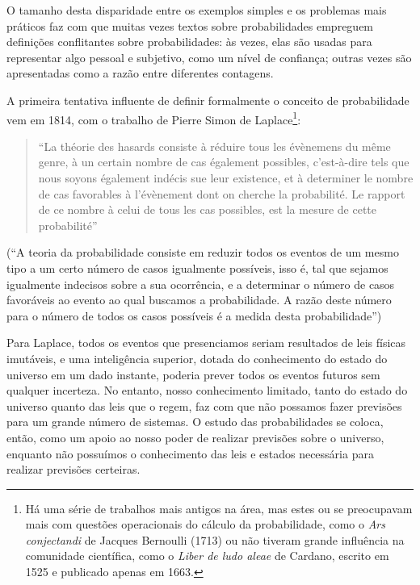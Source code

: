 O tamanho desta disparidade entre os exemplos simples e os problemas mais práticos faz com que muitas vezes
textos sobre probabilidades empreguem definições conflitantes sobre probabilidades: às vezes,
elas são usadas para representar algo pessoal e subjetivo, como um nível de confiança; outras vezes são apresentadas como a
razão entre diferentes contagens.

A primeira tentativa influente de definir formalmente o conceito de probabilidade vem em 1814,
com o trabalho de Pierre Simon de Laplace\footnote{
	Há uma série de trabalhos mais antigos na área, mas estes ou se preocupavam mais com questões
	operacionais do cálculo da probabilidade, como o {\em Ars conjectandi} de Jacques Bernoulli (1713) ou não tiveram 
	grande influência na comunidade científica, como o {\em Liber de ludo aleae} de Cardano, escrito em 1525 e 
	publicado apenas em 1663.
}:

\begin{quote}
``La théorie des hasards consiste à réduire tous les évènemens du même genre, à un certain nombre de cas également
possibles, c'est-à-dire tels que nous soyons également indécis sue leur existence, et à determiner le nombre de cas
favorables à l'évènement dont on cherche la probabilité. Le rapport de ce nombre à celui de tous les cas possibles,
est la mesure de cette probabilité'' 
\citep{Laplace1814}
\end{quote}

(``A teoria da probabilidade consiste em reduzir todos os eventos de um mesmo tipo a um certo número de casos igualmente
possíveis, isso é, tal que sejamos igualmente indecisos sobre a sua ocorrência, e a determinar o número de casos
favoráveis ao evento ao qual buscamos a probabilidade. A razão deste número para o número de todos os casos possíveis
é a medida desta probabilidade'')

Para Laplace, todos os eventos que presenciamos seriam resultados de leis físicas
imutáveis, e uma inteligência superior, dotada do conhecimento do estado do universo em um dado instante, poderia prever
todos os eventos futuros sem qualquer incerteza. No entanto, nosso conhecimento limitado, tanto do estado do universo
quanto das leis que o regem, faz com que não possamos fazer previsões para um grande número de sistemas. O estudo das 
probabilidades se coloca, então, como um apoio ao nosso poder de realizar previsões sobre o universo, 
enquanto não possuímos o conhecimento das leis e estados necessária para realizar previsões certeiras. 

